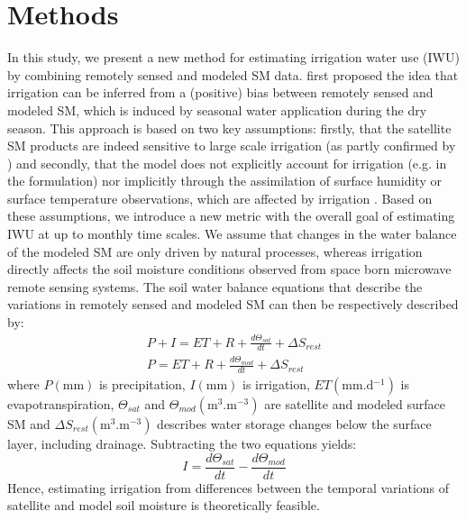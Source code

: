 \documentclass[hess, manuscript]{copernicus}
\begin{document}
\section{Methods}
\label{sec:methods}
In this study, we present a new method for estimating irrigation water use (IWU) by combining remotely sensed and modeled SM data. \citet{Kumar_2015} first proposed the idea that irrigation can be inferred from a (positive) bias between remotely sensed and modeled SM, which is induced by seasonal water application during the dry season. This approach is based on two key assumptions: firstly, that the satellite SM products are indeed sensitive to large scale irrigation (as partly confirmed by \citet{escorihuela2016comparison, Lawston2017}) and secondly, that the model does not explicitly account for irrigation (e.g. in the formulation) nor implicitly through the assimilation of surface humidity or surface temperature observations, which are affected by irrigation \citep{Wei_2013}. Based on these assumptions, we introduce a new metric with the overall goal of estimating IWU at up to monthly time scales. We assume that changes in the water balance of the modeled SM are only driven by natural processes, whereas irrigation directly affects the soil moisture conditions observed from space born microwave remote sensing systems. The soil water balance equations that describe the variations in remotely sensed and modeled SM can then be respectively described by:
%
\begin{equation}
\label{eq:waterbalance}
\begin{gathered}
P + I = ET + R + \frac{d\Theta_{sat}}{dt} + \Delta S_{rest} \\
P = ET + R + \frac{d\Theta_{mod}}{dt} + \Delta S_{rest}
\end{gathered}
\end{equation}
%
where $P (\si{\mm})$ is precipitation, $I (\si{\mm})$ is irrigation, $ET (\si{\mm.\day^{-1}})$ is evapotranspiration, $\Theta_{sat}$ and $\Theta_{mod} (\si{\m^{3}.\m^{-3}})$ are satellite and modeled surface SM and $\Delta S_{rest} (\si{\m^{3}.\m^{-3}})$ describes water storage changes below the surface layer, including drainage. Subtracting the two equations yields:
%
\begin{equation}
\label{eq:irrigation-theoretical}
I =\frac{d\Theta_{sat}}{d t} - \frac{d\Theta_{mod}}{d t}
\end{equation}
%
Hence, estimating irrigation from differences between the temporal variations of satellite and model soil moisture is theoretically feasible. 
\end{document}
